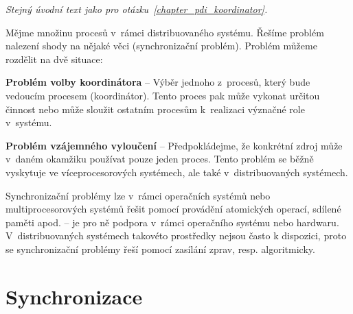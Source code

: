 \begin{compactitem}
    \item \textit{Stejný úvodní text jako pro otázku~\ref{chapter_pdi_koordinator}.}

    \item Mějme množinu procesů v~rámci distribuovaného systému. Řešíme problém  nalezení shody na nějaké věci (synchronizační problém). Problém můžeme rozdělit na dvě situace: \begin{compactitem}
        \item \textbf{Problém volby koordinátora} -- Výběr jednoho z~procesů, který bude vedoucím procesem (koordinátor). Tento proces pak může vykonat určitou činnost nebo může sloužit ostatním procesům k~realizaci  význačné role v~systému.

        \item \textbf{Problém vzájemného vyloučení} -- Předpokládejme, že konkrétní zdroj může v~daném okamžiku používat pouze jeden proces. Tento problém se běžně vyskytuje ve víceprocesorových systémech, ale také v~distribuovaných systémech.
    \end{compactitem}

    \item Synchronizační problémy lze v~rámci operačních systémů nebo multiprocesorových systémů řešit pomocí provádění atomických operací, sdílené paměti apod. -- je pro ně podpora v~rámci operačního systému nebo hardwaru. V~distribuovaných systémech takovéto prostředky nejsou často k dispozici, proto se synchronizační problémy řeší pomocí zasílání zprav, resp. algoritmicky.
\end{compactitem}


\section{Synchronizace}

